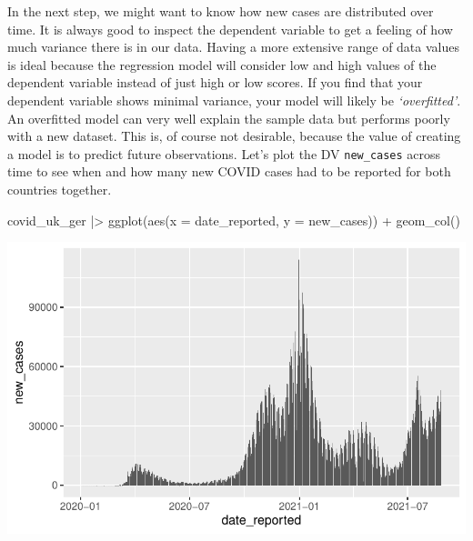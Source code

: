\documentclass[
  letterpaper,
  DIV=11,
  numbers=noendperiod]{scrreprt}
\newenvironment{Shaded}{\begin{snugshade}}{\end{snugshade}}
\newcommand{\AttributeTok}[1]{\textcolor[rgb]{0.40,0.45,0.13}{#1}}
\newcommand{\FunctionTok}[1]{\textcolor[rgb]{0.28,0.35,0.67}{#1}}
\newcommand{\NormalTok}[1]{\textcolor[rgb]{0.00,0.23,0.31}{#1}}
\newcommand{\SpecialCharTok}[1]{\textcolor[rgb]{0.37,0.37,0.37}{#1}}
\begin{document}
In the next step, we might want to know how new cases are distributed
over time. It is always good to inspect the dependent variable to get a
feeling of how much variance there is in our data. Having a more
extensive range of data values is ideal because the regression model
will consider low and high values of the dependent variable instead of
just high or low scores. If you find that your dependent variable shows
minimal variance, your model will likely be \emph{`overfitted'}. An
overfitted model can very well explain the sample data but performs
poorly with a new dataset. This is, of course not desirable, because the
value of creating a model is to predict future observations. Let's plot
the DV \texttt{new\_cases} across time to see when and how many new
COVID cases had to be reported for both countries together.

\begin{Shaded}
\begin{Highlighting}[]
\NormalTok{covid\_uk\_ger }\SpecialCharTok{|\textgreater{}}
  \FunctionTok{ggplot}\NormalTok{(}\FunctionTok{aes}\NormalTok{(}\AttributeTok{x =}\NormalTok{ date\_reported,}
             \AttributeTok{y =}\NormalTok{ new\_cases)) }\SpecialCharTok{+}
  \FunctionTok{geom\_col}\NormalTok{()}
\end{Highlighting}
\end{Shaded}

\includegraphics{13_regressions_files/figure-latex/mr-plot-new-cases-1.pdf}
\end{document}
